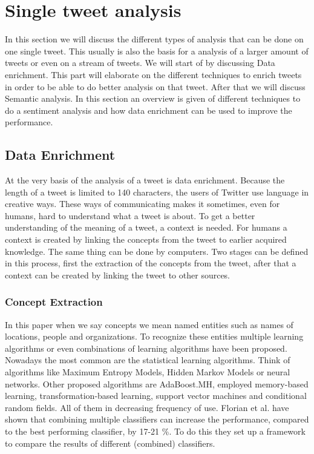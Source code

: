 \documentclass{article}
\begin{document}
\section{Single tweet analysis}
In this section we will discuss the different types of analysis that can be done on one single tweet. This usually is also the basis for a analysis of a larger amount of tweets or even on a stream of tweets. We will start of by discussing Data enrichment. This part will elaborate on the different techniques to enrich tweets in order to be able to do better analysis on that tweet. After that we will discuss Semantic analysis. In this section an overview is given of different techniques to do a sentiment analysis and how data enrichment can be used to improve the performance.
\subsection{Data Enrichment}
At the very basis of the analysis of a tweet is data enrichment. Because the length of a tweet is limited to 140 characters, the users of Twitter use language in creative ways. These ways of communicating makes it sometimes, even for humans, hard to understand what a tweet is about. To get a better understanding of the meaning of a tweet, a context is needed. For humans a context is created by linking the concepts from the tweet to earlier acquired knowledge. The same thing can be done by computers. Two stages can be defined in this process, first the extraction of the concepts from the tweet, after that a context can be created by linking the tweet to other sources.
\subsubsection{Concept Extraction}
In this paper when we say concepts we mean named entities such as names of locations, people and organizations. To recognize these entities multiple learning algorithms or even combinations of learning algorithms have been proposed. Nowadays the most common are the statistical learning algorithms. Think of algorithms like Maximum Entropy Models, Hidden Markov Models or neural networks. Other proposed algorithms are AdaBoost.MH, employed memory-based learning, transformation-based learning, support vector machines and conditional random fields. All of them in decreasing frequency of use.\cite{EntityRecognition} Florian et al. have shown that combining multiple classifiers can increase the performance, compared to the best performing classifier, by 17-21 \%.\cite{ClassifierCombination} To do this they set up a framework to compare the results of different (combined) classifiers.  
\end{document}

